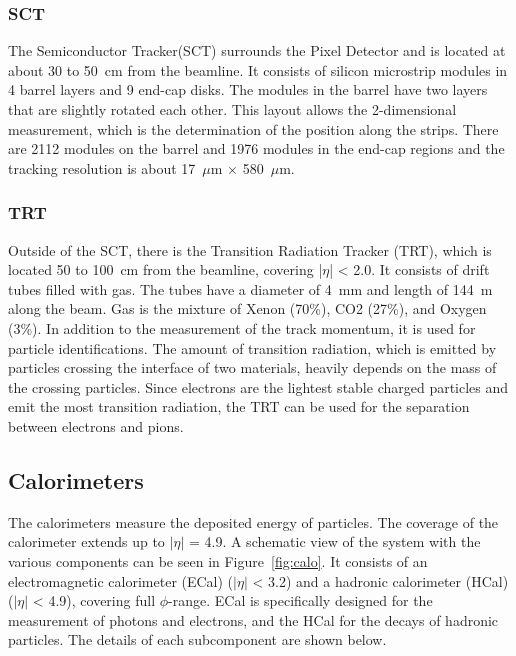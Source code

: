 \subsubsection{SCT}
The Semiconductor Tracker(SCT) surrounds the Pixel Detector and is located at about 30 to 50~cm from the beamline. 
It consists of silicon microstrip modules in 4 barrel layers and 9 end-cap disks.
The modules in the barrel have two layers that are slightly rotated each other. This layout allows the 2-dimensional measurement, which is the determination of the position along the strips. There are 2112 modules on the barrel and 1976 modules in the end-cap regions and the tracking resolution is about 17~$\mu$m $\times$ 580~$\mu$m.

\subsubsection{TRT}
Outside of the SCT, there is the Transition Radiation Tracker (TRT), which is located 50 to 100~cm from the beamline, covering |$\eta$| < 2.0.
It consists of drift tubes filled with gas. The tubes have a diameter of 4~mm and length of 144~m along the beam. Gas is the  mixture of Xenon (70\%), CO2 (27\%), and Oxygen (3\%). 
In addition to the measurement of the track momentum, it is used for particle identifications. 
The amount of transition radiation, which is emitted by particles crossing the interface of two materials, heavily depends on the mass of the crossing particles. Since electrons are the lightest stable charged particles and emit the most transition radiation, the TRT can be used for the separation between electrons and pions.

\subsection{Calorimeters}
The calorimeters measure the deposited energy of particles. 
The coverage of the calorimeter extends up to $|\eta|$ = 4.9. A schematic view of the system with the various components can be seen in Figure~\ref{fig:calo}.
It consists of an electromagnetic calorimeter (ECal) ($|\eta|$ < 3.2) and a hadronic calorimeter (HCal)  ($|\eta|$ < 4.9), covering full $\phi$-range. ECal is specifically designed for the measurement of photons and electrons, and the HCal for the decays of hadronic particles. The details of each subcomponent are shown below.

